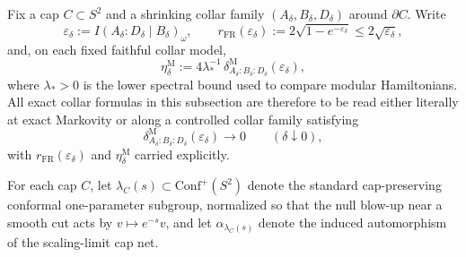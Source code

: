 Fix a cap \(C\subset S^2\) and a shrinking collar family \((A_\delta,B_\delta,D_\delta)\) around \(\partial C\). Write
\[
\varepsilon_\delta:=I(A_\delta:D_\delta\mid B_\delta)_\omega,
\qquad
r_{\mathrm{FR}}(\varepsilon_\delta):=
2\sqrt{1-e^{-\varepsilon_\delta}}
\le 2\sqrt{\varepsilon_\delta},
\]
and, on each fixed faithful collar model,
\[
\eta_\delta^{\mathrm M}
:=
4\lambda_\ast^{-1}\,
\delta^{\mathrm M}_{A_\delta:B_\delta:D_\delta}(\varepsilon_\delta),
\]
where \(\lambda_\ast>0\) is the lower spectral bound used to compare modular Hamiltonians. All exact collar formulas in this subsection are therefore to be read either literally at exact Markovity or along a controlled collar family satisfying
\[
\delta^{\mathrm M}_{A_\delta:B_\delta:D_\delta}(\varepsilon_\delta)\to 0
\qquad(\delta\downarrow 0),
\]
with \(r_{\mathrm{FR}}(\varepsilon_\delta)\) and \(\eta_\delta^{\mathrm M}\) carried explicitly.

For each cap \(C\), let \(\lambda_C(s)\subset \mathrm{Conf}^+(S^2)\) denote the standard cap-preserving conformal one-parameter subgroup, normalized so that the null blow-up near a smooth cut acts by \(v\mapsto e^{-s}v\), and let \(\alpha_{\lambda_C(s)}\) denote the induced automorphism of the scaling-limit cap net.

